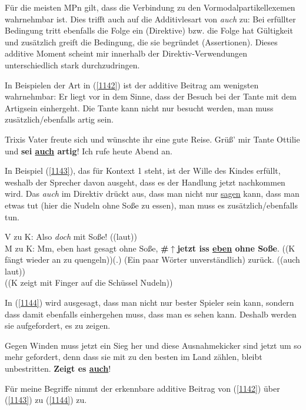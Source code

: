 {Für die meisten MPn gilt, dass die Verbindung zu den Vormodalpartikellexemen  wahrnehmbar ist. Dies trifft auch auf die Additivlesart von \textit{auch} zu: Bei erfüllter Bedingung tritt ebenfalls die Folge ein (Direktive) bzw. die Folge hat Gültigkeit und zusätz\-lich greift die Bedingung, die sie begründet (Assertionen). Dieses additive Moment scheint mir innerhalb der Direktiv-Verwendungen unterschiedlich stark durchzudringen.

In Beispielen der Art in (\ref{1142}) ist der additive Beitrag am wenigsten wahrnehmbar: Er liegt vor in dem Sinne, dass der Besuch bei der Tante mit dem Artigsein einhergeht. Die Tante kann nicht nur besucht werden, man muss zusätzlich/ebenfalls artig sein.

\begin{exe}
	\ex\label{1142} 
	Trixis Vater freute sich und wünschte ihr eine gute Reise. \glqq Grüß' mir Tante Ottilie und \textbf{sei \underline{auch} artig}! Ich rufe heute Abend 		an.\grqq{}
\end{exe}
In Beispiel (\ref{1143}), das für Kontext 1 steht, ist der Wille des Kindes erfüllt, weshalb der Sprecher davon ausgeht, dass es der Handlung jetzt nachkommen wird. Das \textit{auch} im Direktiv drückt aus, dass man nicht nur \underline{sagen} kann, dass man etwas tut (hier die Nudeln ohne Soße zu essen), man muss es zusätzlich/ebenfalls tun.

\begin{exe}
	\ex\label{1143} 
	\scriptsize
 	V zu K: Also \textit{doch} mit Soße! ((laut))\\
	M zu K: Mm, eben hast gesagt \glqq ohne Soße\grqq{}, \textbf{\#$\uparrow$jetzt iss \underline{eben} ohne Soße}. ((K fängt wieder an zu quengeln))(.) 		(Ein paar Wörter unverständlich) zurück. ((auch laut))\\
	((K zeigt mit Finger auf die Schüssel Nudeln))	
\end{exe}
In (\ref{1144}) wird ausgesagt, dass man nicht nur bester Spieler sein kann, sondern dass damit ebenfalls einhergehen muss, dass man es sehen kann. Deshalb werden sie aufgefordert, es zu zeigen.

\begin{exe}
	\ex\label{1144} 
	\scriptsize
	Gegen Winden muss jetzt ein Sieg her und diese Ausnahmekicker sind jetzt um so mehr gefordert, denn dass sie mit zu den besten im Land zählen, bleibt 		unbestritten. \textbf{Zeigt es \underline{auch}}! 
\end{exe}
Für meine Begriffe nimmt der erkennbare additive Beitrag von (\ref{1142}) über (\ref{1143}) zu (\ref{1144}) zu.

}
